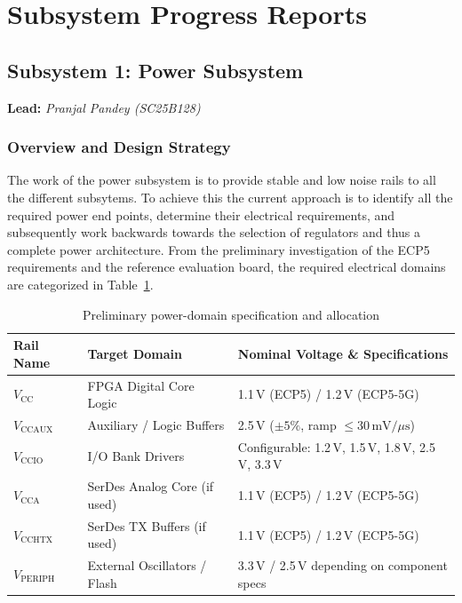 \documentclass[12pt,a4paper]{article}
\begin{document}
\section{Subsystem Progress Reports}

\subsection{Subsystem 1: Power Subsystem}
\noindent\textbf{Lead:} \textit{Pranjal Pandey (SC25B128)}

\subsubsection{Overview and Design Strategy}
The work of the power subsystem is to provide stable and low noise rails to all the different subsytems. To achieve this the current approach is to identify all the required power end points, determine their electrical requirements, and subsequently work backwards towards the selection of regulators and thus a complete power architecture.  From the preliminary investigation of the ECP5 requirements and the reference evaluation board, the required electrical domains are categorized in Table~\ref{tab:power_domains}.

\begin{table}[h]
\centering
\begin{tabular}{lp{5.5cm}p{6cm}}
\toprule
\textbf{Rail Name} & \textbf{Target Domain} & \textbf{Nominal Voltage \& Specifications} \\
\midrule
$V_{\text{CC}}$        & FPGA Digital Core Logic        & 1.1\,V (ECP5) / 1.2\,V (ECP5-5G) \\
$V_{\text{CCAUX}}$     & Auxiliary / Logic Buffers      & 2.5\,V ($\pm 5\%$, ramp $\le 30\,\text{mV}/\mu\text{s}$) \\
$V_{\text{CCIO}}$      & I/O Bank Drivers               & Configurable: 1.2\,V, 1.5\,V, 1.8\,V, 2.5\,V, 3.3\,V \\
$V_{\text{CCA}}$       & SerDes Analog Core (if used)   & 1.1\,V (ECP5) / 1.2\,V (ECP5-5G) \\
$V_{\text{CCHTX}}$     & SerDes TX Buffers (if used)    & 1.1\,V (ECP5) / 1.2\,V (ECP5-5G) \\
$V_{\text{PERIPH}}$    & External Oscillators / Flash   & 3.3\,V / 2.5\,V depending on component specs \\
\bottomrule
\end{tabular}
\caption{Preliminary power-domain specification and allocation}
\label{tab:power_domains}
\end{table}
\end{document}
